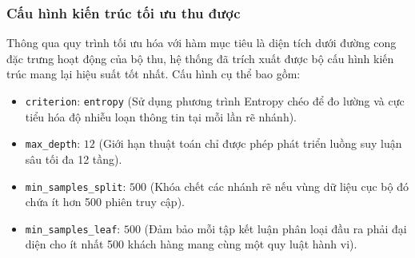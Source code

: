 \documentclass[a4paper,11pt]{article}
\begin{document}
\subsubsection*{Cấu hình kiến trúc tối ưu thu được}
Thông qua quy trình tối ưu hóa với hàm mục tiêu là diện tích dưới đường cong đặc trưng hoạt động của bộ thu, hệ thống đã trích xuất được bộ cấu hình kiến trúc mang lại hiệu suất tốt nhất. Cấu hình cụ thể bao gồm:

\begin{itemize}[itemsep=4pt, leftmargin=*]
    \item \texttt{criterion}: \texttt{entropy} (Sử dụng phương trình Entropy chéo để đo lường và cực tiểu hóa độ nhiễu loạn thông tin tại mỗi lần rẽ nhánh).
    \item \texttt{max\_depth}: $12$ (Giới hạn thuật toán chỉ được phép phát triển luồng suy luận sâu tối đa 12 tầng).
    \item \texttt{min\_samples\_split}: $500$ (Khóa chết các nhánh rẽ nếu vùng dữ liệu cục bộ đó chứa ít hơn 500 phiên truy cập).
    \item \texttt{min\_samples\_leaf}: $500$ (Đảm bảo mỗi tập kết luận phân loại đầu ra phải đại diện cho ít nhất 500 khách hàng mang cùng một quy luật hành vi).
\end{itemize}
\end{document}

